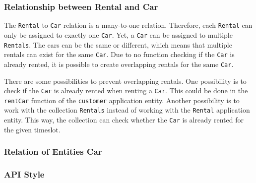 \subsubsection*{Relationship between Rental and Car}
The \texttt{Rental} to \texttt{Car} relation is a many-to-one relation.
Therefore, each \texttt{Rental} can only be assigned to exactly one \texttt{Car}.
Yet, a \texttt{Car} can be assigned to multiple \texttt{Rentals}.
The cars can be the same or different, which means that multiple rentals can exist for the same \texttt{Car}.
Due to no function checking if the \texttt{Car} is already rented, it is possible to create overlapping rentals for the same \texttt{Car}.

There are some possibilities to prevent overlapping rentals.
One possibility is to check if the \texttt{Car} is already rented when renting a \texttt{Car}.
This could be done in the \texttt{rentCar} function of the \texttt{customer} application entity.
Another possibility is to work with the collection \texttt{Rentals} instead of working with the \texttt{Rental} application entity.
This way, the collection can check whether the \texttt{Car} is already rented for the given timeslot.

\subsubsection*{Relation of Entities Car}

\subsubsection*{API Style}